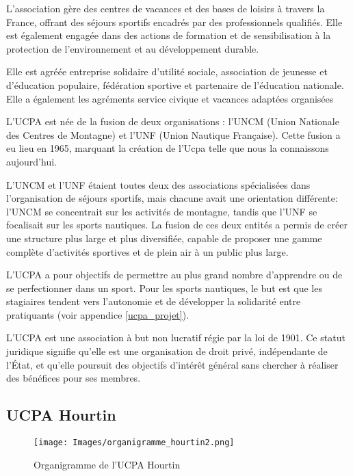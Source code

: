 \documentclass[11pt,a4paper]{report}
\begin{document}
L'association gère des centres de vacances et des bases de loisirs à travers la
France, offrant des séjours sportifs encadrés par des professionnels qualifiés.
Elle est également engagée dans des actions de formation et de sensibilisation 
à la protection de l'environnement et au développement durable.

Elle est agréée entreprise solidaire d’utilité sociale, association de
jeunesse et d’éducation populaire, fédération sportive et partenaire de 
l’éducation nationale. Elle a également les agréments service civique et
vacances adaptées organisées

L'UCPA est  née de la fusion de deux organisations : l'UNCM 
(Union Nationale des Centres de Montagne) et l'UNF 
(Union Nautique Française). Cette fusion a eu lieu en 1965, 
marquant la création de l'Ucpa telle que nous la connaissons
aujourd'hui.

L'UNCM et l'UNF étaient toutes deux des associations spécialisées
dans l'organisation de séjours sportifs, mais chacune avait une
orientation différente: l'UNCM se concentrait sur les activités 
de montagne, tandis que l'UNF se focalisait sur les sports nautiques. 
La fusion de ces deux entités a permis de créer une structure plus 
large et plus diversifiée, capable de proposer une gamme complète 
d'activités sportives et de plein air à un public plus large.

L'UCPA a pour objectifs de permettre au plus grand nombre
d'apprendre ou de se perfectionner dans un sport.
Pour les sports nautiques, le but est que les stagiaires
tendent vers l'autonomie  et de développer la solidarité entre
pratiquants (voir appendice \ref{ucpa_projet}).


L'UCPA est 
une association à but non lucratif régie par la loi de 1901. 
Ce statut juridique signifie qu'elle est une organisation de
droit privé, indépendante de l'État, et qu'elle poursuit des
objectifs d'intérêt général sans chercher à  réaliser des
bénéfices pour ses membres.

\subsection{UCPA Hourtin}
\begin{figure}[h]
\centering
\texttt{[image: Images/organigramme\_hourtin2.png]} 
\caption{Organigramme de l'UCPA Hourtin\label{organi_hourtin}}
\end{figure}
\end{document}
